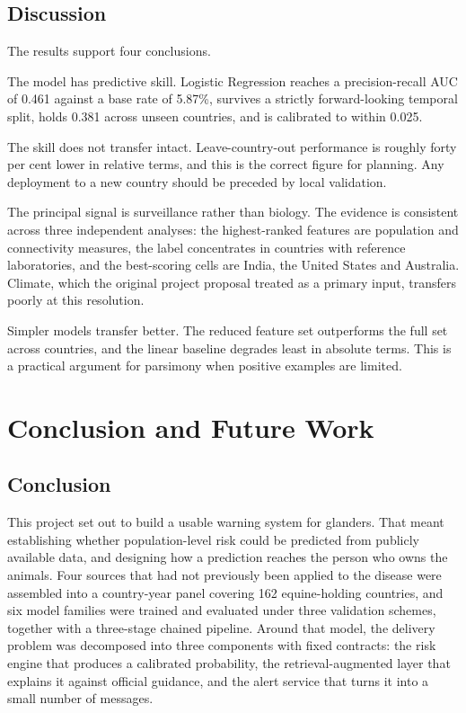 \documentclass[10pt,openany]{report}
\begin{document}
\section{Discussion}

The results support four conclusions.

The model has predictive skill. Logistic Regression reaches a precision-recall AUC of 0.461 against a base
rate of 5.87\%, survives a strictly forward-looking temporal split, holds 0.381 across
unseen countries, and is calibrated to within 0.025.

The skill does not transfer intact. Leave-country-out performance is roughly forty per cent lower
in relative terms, and this is the correct figure for planning. Any deployment to a new country
should be preceded by local validation.

The principal signal is surveillance rather than biology. The evidence is consistent across three
independent analyses: the highest-ranked features are population and connectivity measures, the
label concentrates in countries with reference laboratories, and the best-scoring cells are India,
the United States and Australia. Climate, which the original project proposal treated as a
primary input, transfers poorly at this resolution.

Simpler models transfer better. The reduced feature set outperforms the full set across countries,
and the linear baseline degrades least in absolute terms. This is a practical argument for
parsimony when positive examples are limited.

\chapter{Conclusion and Future Work}
\label{ch:concl}

\section{Conclusion}

This project set out to build a usable warning system for glanders. That meant establishing
whether population-level risk could be predicted from publicly available data, and designing how a
prediction reaches the person who owns the animals. Four sources that had not previously
been applied to the disease were assembled into a country-year panel covering 162 equine-holding
countries, and six model families were trained and evaluated under three validation schemes,
together with a three-stage chained pipeline. Around that model, the delivery problem was
decomposed into three components with fixed contracts: the risk engine that produces a calibrated
probability, the retrieval-augmented layer that explains it against official guidance, and the
alert service that turns it into a small number of messages.
\end{document}
